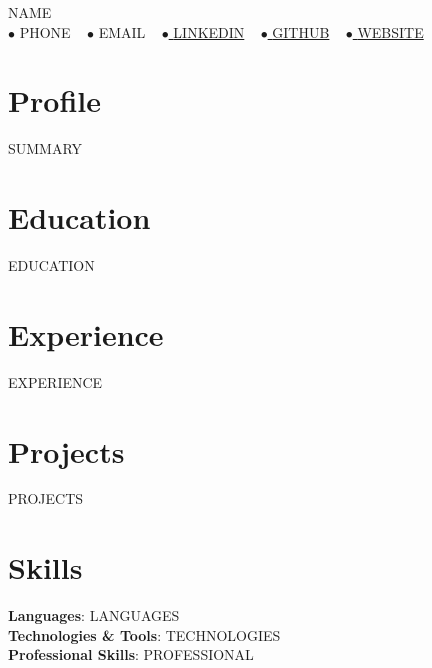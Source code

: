 \documentclass[a4paper,10pt]{article}
\newcommand{\resumeSubHeadingListStart}{\begin{itemize}[leftmargin=0.0in, label={}]}
\newcommand{\resumeSubHeadingListEnd}{\end{itemize}}
\begin{document}
\begin{center}
    {\Huge \scshape {{NAME}}} \\ \vspace{5pt}
    \small $\bullet$ {{PHONE}} ~
    \small $\bullet$ {{EMAIL}} ~
    \href{https://{{LINKEDIN}}}{\small $\bullet$ {{LINKEDIN}}} ~
    \href{https://{{GITHUB}}}{\small $\bullet$ {{GITHUB}}} ~
    \href{https://{{WEBSITE}}}{\small $\bullet$ {{WEBSITE}}}
    \vspace{-6pt}
\end{center}

\section{Profile}
\small{{{SUMMARY}}}
\vspace{-6pt}

\section{Education}
  \resumeSubHeadingListStart
{{EDUCATION}}
  \resumeSubHeadingListEnd
\vspace{-6pt}

\section{Experience}
  \vspace{-4pt}
    \resumeSubHeadingListStart
{{EXPERIENCE}}
    \resumeSubHeadingListEnd
\vspace{-8pt}

\section{Projects}
    \vspace{-4pt}
    \resumeSubHeadingListStart
{{PROJECTS}}
    \resumeSubHeadingListEnd
\vspace{-8pt}

\section{Skills}
 \begin{itemize}[leftmargin=0.15in, label={}]
    \small{\item{
     \textbf{Languages}{: {{LANGUAGES}}} \\
     \textbf{Technologies \& Tools}{: {{TECHNOLOGIES}}} \\
     \textbf{Professional Skills}{: {{PROFESSIONAL}}} \\
    }}
 \end{itemize}
 \vspace{-12pt}
\end{document}

